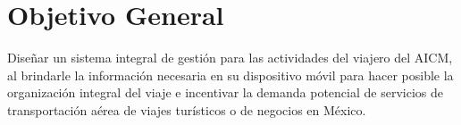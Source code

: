 \section{Objetivo General}

Diseñar un sistema integral de gestión para las actividades del viajero del AICM, al brindarle la información necesaria en su dispositivo móvil para hacer posible la organización integral del viaje e incentivar la demanda potencial de servicios de transportación aérea de viajes turísticos o de negocios en México.